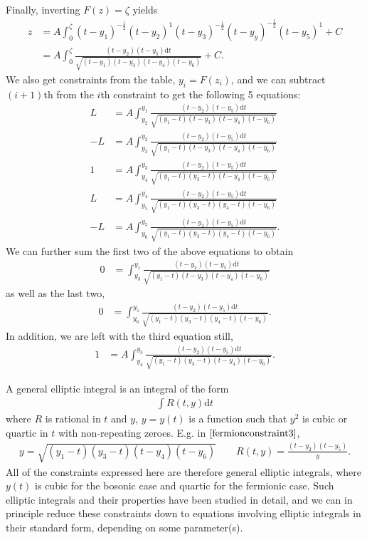 \documentclass[10pt]{article}
\newcommand{\dif}{\mathrm{d}}
\theoremstyle{plain}
\theoremstyle{definition}
\theoremstyle{plain}
\begin{document}
Finally, inverting $F(z) = \zeta$ yields
\begin{align}
	z &= A\int_0^\zeta (t-y_1)^{-\frac{1}{2}}(t-y_2)^1(t-y_3)^{-\frac{1}{2}}(t-y_y)^{-\frac{1}{2}}(t-y_5)^1 + C\nonumber\\
	&= A\int_0^\zeta \frac{(t-y_2)(t-y_5)\dif t}{\sqrt{(t-y_1)(t-y_3)(t-y_4)(t-y_6)}} + C.\label{fermionfn}
\end{align}
We also get constraints from the table, $y_i = F(z_i)$, and we can subtract $(i+1)$th from the $i$th constraint to get the following 5 equations:
\begin{align*}
	L &= A\int_{y_2}^{y_1}\frac{(t-y_2)(t-y_5)\dif t}{\sqrt{(y_1-t)(t-y_3)(t-y_4)(t-y_6)}} \\
	-L &= A\int_{y_3}^{y_2} \frac{(t-y_2)(t-y_5)\dif t}{\sqrt{(y_1-t)(t-y_3)(t-y_4)(t-y_6)}}\\
	1 &= A\int_{y_4}^{y_3} \frac{(t-y_2)(t-y_5)\dif t}{\sqrt{(y_1-t)(y_3-t)(t-y_4)(t-y_6)}}\\
	L &= A\int_{y_5}^{y_4} \frac{(t-y_2)(t-y_5)\dif t}{\sqrt{(y_1-t)(y_3-t)(y_4-t)(t-y_6)}}\\
	-L &= A\int_{y_6}^{y_5} \frac{(t-y_2)(t-y_5)\dif t}{\sqrt{(y_1-t)(y_3-t)(y_4-t)(t-y_6)}}.
\end{align*}
We can further sum the first two of the above equations to obtain
\begin{align}
	0 &= \int_{y_3}^{y_1} \frac{(t-y_2)(t-y_5)\dif t}{\sqrt{(y_1-t)(t-y_3)(t-y_4)(t-y_6)}} \label{fermionconstraint1}
\end{align}
as well as the last two,
\begin{align}
	0 &= \int_{y_6}^{y_5} \frac{(t-y_2)(t-y_5)\dif t}{\sqrt{(y_1-t)(y_3-t)(y_4-t)(t-y_6)}}. \label{fermionconstraint2}
\end{align}
In addition, we are left with the third equation still,
\begin{align}
	1 &= A\int_{y_4}^{y_3} \frac{(t-y_2)(t-y_5)\dif t}{\sqrt{(y_1-t)(y_3-t)(t-y_4)(t-y_6)}}. \label{fermionconstraint3}
\end{align}

A general elliptic integral is an integral of the form
\begin{align*}
	\int R(t,y)\dif t
\end{align*}
where $R$ is rational in $t$ and $y$, $y=y(t)$ is a function such that $y^2$ is cubic or quartic in $t$ with non-repeating zeroes. E.g. in $\ref{fermionconstraint3}$, 
\begin{align*}
	y = \sqrt{(y_1-t)(y_3-t)(t-y_4)(t-y_6)} \qquad R(t,y) = \frac{(t-y_2)(t-y_5)}{y}.
\end{align*}
All of the constraints expressed here are therefore general elliptic integrals, where $y(t)$ is cubic for the bosonic case and quartic for the fermionic case. Such elliptic integrals and their properties have been studied in detail, and we can in principle reduce these constraints down to equations involving elliptic integrals in their standard form, depending on some parameter(s). 
\end{document}
